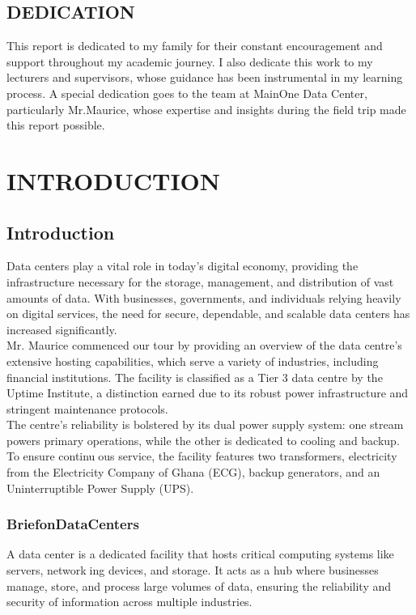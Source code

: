 \documentclass[12pt]{report}
\begin{document}
\newpage
\section*{DEDICATION}
This report is dedicated to my family for their constant encouragement and support throughout my academic journey. I also dedicate this work to my lecturers and supervisors, whose guidance has been instrumental in my learning process. A special dedication goes to the team at MainOne Data Center, particularly Mr.Maurice, whose expertise and insights during the field trip made this report possible.

\newpage

\tableofcontents
\listoffigures


\pagestyle{empty}
\centering
{}
\chapter{INTRODUCTION}
\section{Introduction}
\begin{justify}
Data centers play a vital role in today’s digital economy, providing the infrastructure necessary for the storage, management, and distribution of vast amounts of data. With businesses, governments, and individuals relying heavily on digital services, the need for secure, dependable, and scalable data centers has increased significantly.\\
Mr. Maurice commenced our tour by providing an overview of the data centre’s extensive
hosting capabilities, which serve a variety of industries, including financial institutions. The
facility is classified as a Tier 3 data centre by the Uptime Institute, a distinction earned due to
its robust power infrastructure and stringent maintenance protocols.\\
The centre’s reliability is bolstered by its dual power supply system: one stream powers
primary operations, while the other is dedicated to cooling and backup. To ensure continuous service, the facility features two transformers, electricity from the Electricity Company of
Ghana (ECG), backup generators, and an Uninterruptible Power Supply (UPS).
\end{justify}
\subsection{Brief\hspace{0.5cm}on\hspace{0.5cm}Data\hspace{0.5cm}Centers}
\begin{justify}
A data center is a dedicated facility that hosts critical computing systems like servers, networking devices, and storage. It acts as a hub where businesses manage, store, and process large
volumes of data, ensuring the reliability and security of information across multiple industries.
\end{justify}
\end{document}
